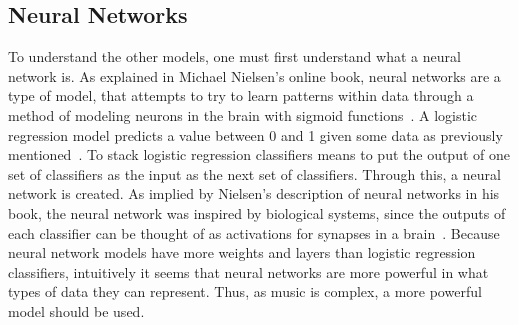 \documentclass[12pt, titlepage]{article}
\begin{document}
\subsection{Neural Networks}
To understand the other models, one must first understand what a neural network
is. As explained in Michael Nielsen's online book, neural networks are a type of
model, that attempts to try to learn patterns within data through a method of
modeling neurons in the brain with sigmoid functions~\cite{nielbook}. A logistic
regression model predicts a value between 0 and 1 given some data as previously
mentioned~\cite{ngrepr}. To stack logistic regression classifiers means to put
the output of one set of classifiers as the input as the next set of
classifiers. Through this, a neural network is created. As implied by Nielsen's
description of neural networks in his book, the neural network was inspired by
biological systems, since the outputs of each classifier can be thought of as
activations for synapses in a brain~\cite{nielbook}. Because neural network
models have more weights and layers than logistic regression classifiers,
intuitively it seems that neural networks are more powerful in what types of
data they can represent. Thus, as music is complex, a more powerful model should
be used.



\end{document}
